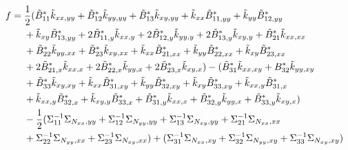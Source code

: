 \documentclass[journal]{new-aiaa}
\begin{document}
\begin{align}
f={}&
\frac{1}{2}(\tilde{B}^{*}_{11}\tilde{k}_{xx,yy} + \tilde{B}^{*}_{12}\tilde{k}_{yy,yy} + \tilde{B}^{*}_{13}\tilde{k}_{xy,yy} + \tilde{k}_{xx}\tilde{B}^{*}_{11,yy} +\tilde{k}_{yy}\tilde{B}^{*}_{12,yy} \notag\\
& + \tilde{k}_{xy}\tilde{B}^{*}_{13,yy} + 2\tilde{B}^{*}_{11,y}\tilde{k}_{xx,y} + 2\tilde{B}^{*}_{12,y}\tilde{k}_{yy,y} + 2\tilde{B}^{*}_{13,y}\tilde{k}_{xy,y} + 
\tilde{B}^{*}_{21}\tilde{k}_{xx,xx} \notag\\
&+ \tilde{B}^{*}_{22}\tilde{k}_{yy,xx} + \tilde{B}^{*}_{23}\tilde{k}_{xy,xx} + \tilde{k}_{xx}\tilde{B}^{*}_{21,xx} + \tilde{k}_{yy}\tilde{B}^{*}_{22,xx} +  \tilde{k}_{xy}\tilde{B}^{*}_{23,xx}\notag\\
&+ 2\tilde{B}^{*}_{21,x}\tilde{k}_{xx,x} + 2\tilde{B}^{*}_{22,x}\tilde{k}_{yy,x} + 2\tilde{B}^{*}_{23,x}\tilde{k}_{xy,x})- (\tilde{B}^{*}_{31}\tilde{k}_{xx,xy} +  B^{*}_{32}\tilde{k}_{yy,xy}\notag\\
&+ \tilde{B}^{*}_{33}\tilde{k}_{xy,xy} + \tilde{k}_{xx}\tilde{B}^{*}_{31,xy} + \tilde{k}_{yy}\tilde{B}^{*}_{32,xy} + \tilde{k}_{xy}\tilde{B}^{*}_{33,xy}
+  \tilde{k}_{xx,y}\tilde{B}^{*}_{31,x} \notag\\ &+ \tilde{k}_{xx,y}\tilde{B}^{*}_{32,x} + \tilde{k}_{xy,y}\tilde{B}^{*}_{33,x} + \tilde{B}^{*}_{31,y}\tilde{k}_{xx,x} + \tilde{B}^{*}_{32,y}\tilde{k}_{yy,x}
+ \tilde{B}^{*}_{33,y}\tilde{k}_{xy,x})\notag\\&- \frac{1}{2} (\Sigma^{-1}_{11}\Sigma_{N_{xx},yy} + \Sigma^{-1}_{12}\Sigma_{N_{yy},yy} + \Sigma^{-1}_{13}\Sigma_{N_{xy},yy} + \Sigma^{-1}_{21}\Sigma_{N_{xx},xx} \notag\\
&+  \Sigma^{-1}_{22}\Sigma_{N_{yy},xx} + \Sigma^{-1}_{23}\Sigma_{N_{xy},xx}) + (\Sigma^{-1}_{31}\Sigma_{N_{xx},xy}+ \Sigma^{-1}_{32}\Sigma_{N_{yy},xy} + \Sigma^{-1}_{33}\Sigma_{N_{xy},xy})
\label{eq:frhs}
\end{align}


\end{document}
